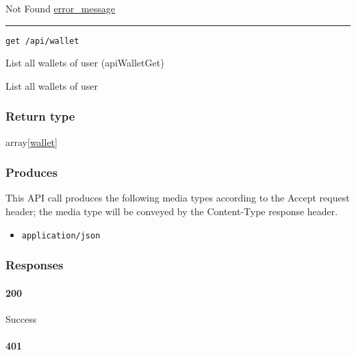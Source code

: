 Not Found \protect\hyperlink{error_message}{error\_message}

\begin{center}\rule{0.5\linewidth}{\linethickness}\end{center}

\protect\hypertarget{apiWalletGet}{}{}

\begin{verbatim}
get /api/wallet
\end{verbatim}

List all wallets of user ({apiWalletGet})

List all wallets of user

\hypertarget{return-type-9}{%
\subsubsection{Return type}\label{return-type-9}}

array{[}\protect\hyperlink{wallet}{wallet}{]}

\hypertarget{produces-12}{%
\subsubsection{Produces}\label{produces-12}}

This API call produces the following media types according to the
{Accept} request header; the media type will be conveyed by the
{Content-Type} response header.

\begin{itemize}
\tightlist
\item
  \texttt{application/json}
\end{itemize}

\hypertarget{responses-12}{%
\subsubsection{Responses}\label{responses-12}}

\hypertarget{section-40}{%
\paragraph{200}\label{section-40}}

Success

\hypertarget{section-41}{%
\paragraph{401}\label{section-41}}

